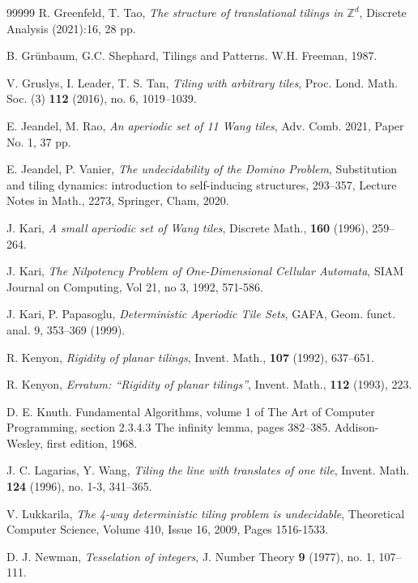 \documentclass[reqno,a4paper,12pt]{amsart}
\numberwithin{equation}{section}
\numberwithin{figure}{section}
\def\Z{\mathbb{Z}}
\theoremstyle{plain}
\theoremstyle{definition}
\begin{document}
\begin{thebibliography}{99999}
		R. Greenfeld, T. Tao, 
		\emph{The structure of translational tilings in $\Z^d$}, Discrete Analysis (2021):16, 28 pp.
		 
		 B. Gr\"unbaum, G.C. Shephard, Tilings and Patterns. W.H. Freeman, 1987.
		 
		V. Gruslys, I. Leader, T. S. Tan, \emph{Tiling with arbitrary tiles}, Proc. Lond. Math. Soc. (3) \textbf{112} (2016), no. 6, 1019--1039.
		  
		 E. Jeandel, M. Rao, \emph{An aperiodic set of 11 Wang tiles}, Adv. Comb. 2021, Paper No. 1, 37 pp.

E. Jeandel, P. Vanier, \emph{The undecidability of the Domino Problem}, Substitution and tiling dynamics: introduction to self-inducing structures, 293–357, Lecture Notes in Math., 2273, Springer, Cham, 2020.

J. Kari,  \emph{A small aperiodic set of Wang tiles}, Discrete Math., \textbf{160} (1996), 259--264.

J. Kari, \emph{The Nilpotency Problem of One-Dimensional Cellular Automata}, SIAM Journal on Computing, Vol 21, no 3, 1992, 571-586.
 
J. Kari, P. Papasoglu, \emph{Deterministic Aperiodic Tile Sets}, GAFA, Geom. funct. anal. 9, 353–369 (1999).
		
R. Kenyon, \emph{Rigidity of planar tilings}, Invent. Math., \textbf{107} (1992), 637--651. 

R. Kenyon, \emph{Erratum: ``Rigidity of planar tilings''}, Invent. Math., \textbf{112} (1993), 223. 

		D. E. Knuth. Fundamental Algorithms, volume 1 of The Art of Computer Programming, section
2.3.4.3 The infinity lemma, pages 382--385. Addison-Wesley, first edition, 1968.

    J. C. Lagarias, Y. Wang, \emph{Tiling the line with translates of one tile}, Invent. Math. \textbf{124} (1996), no. 1-3, 341–365.
    
    V. Lukkarila, \emph{The 4-way deterministic tiling problem is undecidable}, Theoretical Computer Science, Volume 410, Issue 16, 2009, Pages 1516-1533.

		D. J. Newman, \emph{Tesselation of integers}, J. Number Theory \textbf{9} (1977), no. 1, 107--111.
		

\end{thebibliography}
\end{document}
